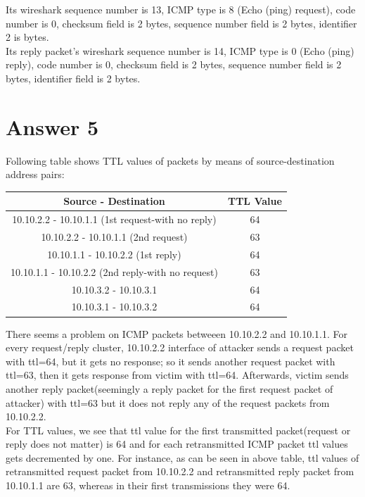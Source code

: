 \documentclass[10pt]{article}
\begin{document}
Its wireshark sequence number is 13, ICMP type is 8 (Echo (ping) request), code number is 0, checksum field is 2 bytes, sequence number field is 2 bytes, identifier 2 is bytes. \\

Its reply packet's wireshark sequence number is 14, ICMP type is 0 (Echo (ping) reply), code number is 0, checksum field is 2 bytes, sequence number field is 2 bytes, identifier field is 2 bytes. 

\section*{Answer 5}
\hspace{4mm}	
Following table shows TTL values of packets by means of source-destination address pairs: \\

\begin{table}[H]
\small
\centering
\begin{tabular}{|c|c|}	
\hline
Source - Destination & TTL Value\\
\hline 
10.10.2.2 - 10.10.1.1 (1st request-with no reply) & 64 \\	
10.10.2.2 - 10.10.1.1 (2nd request) & 63 \\			
10.10.1.1 - 10.10.2.2 (1st reply) & 64 \\		
10.10.1.1 - 10.10.2.2 (2nd reply-with no request) & 63 \\
10.10.3.2 - 10.10.3.1  & 64 \\
10.10.3.1 - 10.10.3.2  & 64 \\
\hline 
\end{tabular}
\end{table}

There seems a problem on ICMP packets betweeen 10.10.2.2 and 10.10.1.1. For every request/reply cluster, 10.10.2.2 interface of attacker sends a request packet with ttl=64, but it gets no response; so it sends another request packet with ttl=63, then it gets response from victim with ttl=64. Afterwards, victim sends another reply packet(seemingly a reply packet for the first request packet of attacker) with ttl=63 but it does not reply any of the request packets from 10.10.2.2. \\

For TTL values, we see that ttl value for the first transmitted packet(request or reply does not matter) is 64 and for each retransmitted ICMP packet ttl values gets decremented by one. For instance, as can be seen in above table, ttl values of retransmitted request packet from 10.10.2.2 and retransmitted reply packet from 10.10.1.1 are 63, whereas in their first transmissions they were 64.
\end{document}
